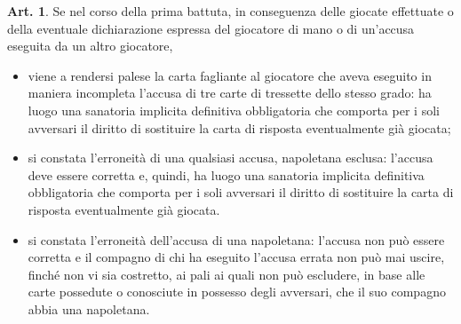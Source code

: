 \documentclass[italian,a4paper]{book}
\theoremstyle{definition}
\newtheorem{art}{Art.}
\newenvironment{packeditem}{
\begin{itemize}
  \setlength{\itemsep}{1pt}
  \setlength{\parskip}{0pt}
  \setlength{\parsep}{0pt}
}{\end{itemize}}
\begin{document}
\begin{art}
Se nel corso della prima battuta, in conseguenza delle giocate effettuate o della eventuale dichiarazione espressa del giocatore di mano o di un'accusa eseguita da un altro giocatore,
\begin{packeditem}
\item    viene a rendersi palese la carta fagliante al giocatore che aveva eseguito in maniera incompleta l'accusa di tre carte di tressette dello stesso grado: ha luogo una sanatoria implicita definitiva obbligatoria che comporta per i soli avversari il diritto di sostituire la carta di risposta eventualmente già giocata;
\item    si constata l'erroneità di una qualsiasi accusa, napoletana esclusa: l'accusa deve essere corretta e, quindi, ha luogo una sanatoria implicita definitiva obbligatoria che comporta per i soli avversari il diritto di sostituire la carta di risposta eventualmente già giocata.
\item     si constata l'erroneità dell'accusa di una napoletana: l'accusa non può essere corretta e il compagno di chi ha eseguito l'accusa errata non può mai uscire, finché non vi sia  costretto, ai pali ai quali non può escludere, in base alle carte possedute o conosciute in possesso degli avversari, che il suo compagno abbia una napoletana. 
    \end{packeditem}
\end{art}
\end{document}
